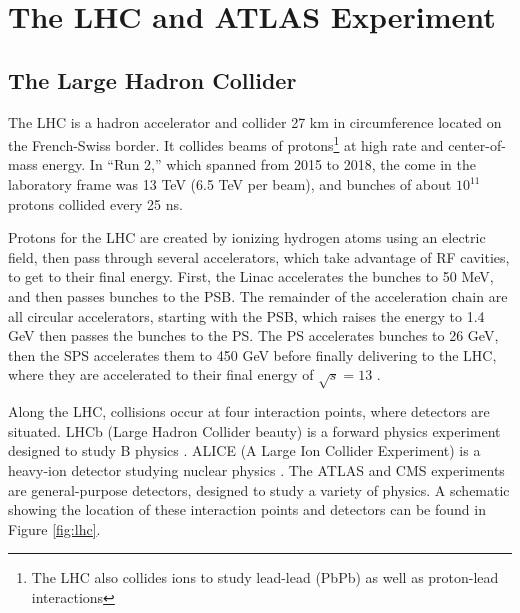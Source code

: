\chapter{The LHC and ATLAS Experiment}
\section{The Large Hadron Collider}
The \gls{LHC} \cite{lhc} is a hadron accelerator and collider 27 km in circumference located on the French-Swiss border. It collides beams of protons\footnote{The LHC also collides ions to study lead-lead (PbPb) as well as proton-lead interactions} at high rate and center-of-mass energy. In ``Run 2,'' which spanned from 2015 to 2018, the \gls{come} in the laboratory frame was 13 TeV (6.5 TeV per beam), and bunches of about $10^{11}$ protons collided every 25 ns.

Protons for the \gls{LHC} are created by ionizing hydrogen atoms using an electric field, then pass through several accelerators, which take advantage of \gls{RF} cavities, to get to their final energy. First, the \gls{Linac} accelerates the bunches to 50 MeV, and then passes bunches to the \gls{PSB}. The remainder of the acceleration chain are all circular accelerators, starting with the \gls{PSB}, which raises the energy to 1.4 GeV then passes the bunches to the \gls{PS}. The \gls{PS} accelerates bunches to 26 GeV, then the \gls{SPS} accelerates them to 450 GeV before finally delivering to the \gls{LHC}, where they are accelerated to their final energy of $\sqrt{s} = 13 $ \TeV.


Along the \gls{LHC}, collisions occur at four interaction points, where detectors are situated. LHCb (Large Hadron Collider beauty) is a forward physics experiment designed to study B physics \cite{lhcb}. ALICE (A Large Ion Collider Experiment) is a heavy-ion detector studying nuclear physics \cite{alice}. The ATLAS \cite{atlas-experiment} and \gls{CMS} \cite{cms} experiments are general-purpose detectors, designed to study a variety of physics. A schematic showing the location of these interaction points and detectors can be found in Figure \ref{fig:lhc}.

